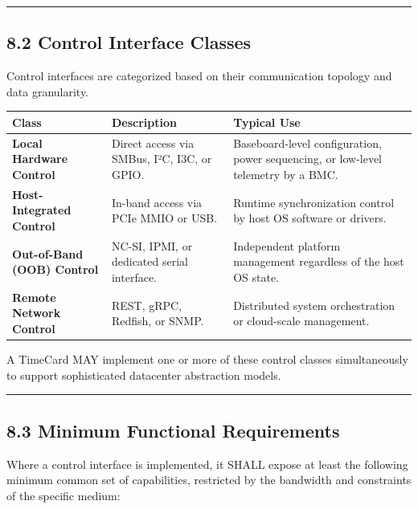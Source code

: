 \documentclass[
]{article}
\newcounter{none} %
\begin{document}
\begin{center}\rule{0.5\linewidth}{0.5pt}\end{center}

\subsection{8.2 Control Interface
Classes}\label{control-interface-classes}

Control interfaces are categorized based on their communication topology
and data granularity.

{\def\LTcaptype{none} %
\begin{longtable}[]{@{}
  >{\raggedright\arraybackslash}p{}
  >{\raggedright\arraybackslash}p{}
  >{\raggedright\arraybackslash}p{}@{}}
\toprule\noalign{}
Class & Description & Typical Use \\
\midrule\noalign{}
\endhead
\bottomrule\noalign{}
\endlastfoot
\textbf{Local Hardware Control} & Direct access via SMBus, I²C, I3C, or
GPIO. & Baseboard-level configuration, power sequencing, or low-level
telemetry by a BMC. \\
\textbf{Host-Integrated Control} & In-band access via PCIe MMIO or USB.
& Runtime synchronization control by host OS software or drivers. \\
\textbf{Out-of-Band (OOB) Control} & NC-SI, IPMI, or dedicated serial
interface. & Independent platform management regardless of the host OS
state. \\
\textbf{Remote Network Control} & REST, gRPC, Redfish, or SNMP. &
Distributed system orchestration or cloud-scale management. \\
\end{longtable}
}

A TimeCard MAY implement one or more of these control classes
simultaneously to support sophisticated datacenter abstraction models.

\begin{center}\rule{0.5\linewidth}{0.5pt}\end{center}

\subsection{8.3 Minimum Functional
Requirements}\label{minimum-functional-requirements}

Where a control interface is implemented, it SHALL expose at least the
following minimum common set of capabilities, restricted by the
bandwidth and constraints of the specific medium:
\end{document}
